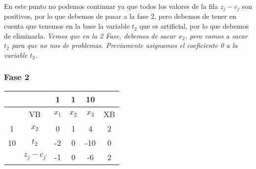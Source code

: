 \begin{itemize}



    En este punto no podemos continuar ya que todos los valores de la fila $z_j - c_j$ son positivos, por lo que debemos de pasar a la fase 2, pero debemos de tener en cuenta que tenemos en la base la variable $t_2$ que es artificial, por lo que debemos de eliminarla. \textit{Vemos que en la 2 Fase, debemos de sacar $x_2$, pero vamos a sacar $t_2$ para que no nos de problemas. Previamente asignamos el coeficiente 0 a la variable $t_2$.}

    \subsubsection*{Fase 2}


    \begin{table}[H]
        \centering
        \begin{tabular}{|c|c|c|c|c|c|}
        \hline
        &  & 1 & 1 & 10 &\\
        \hline
        & VB & $x_1$ & $x_2$ & $x_3$ & XB \\
        \hline
        1 & $x_2$ & 0 & 1 & 4 & 2\\
        \hline
        10 & $t_2$ & -2 & 0 & -10 & 0\\
        \hline
        & $z_j - c_j$ & -1 & 0 & -6 &2\\
        \hline
        \end{tabular}
    \end{table}


\end{itemize}
